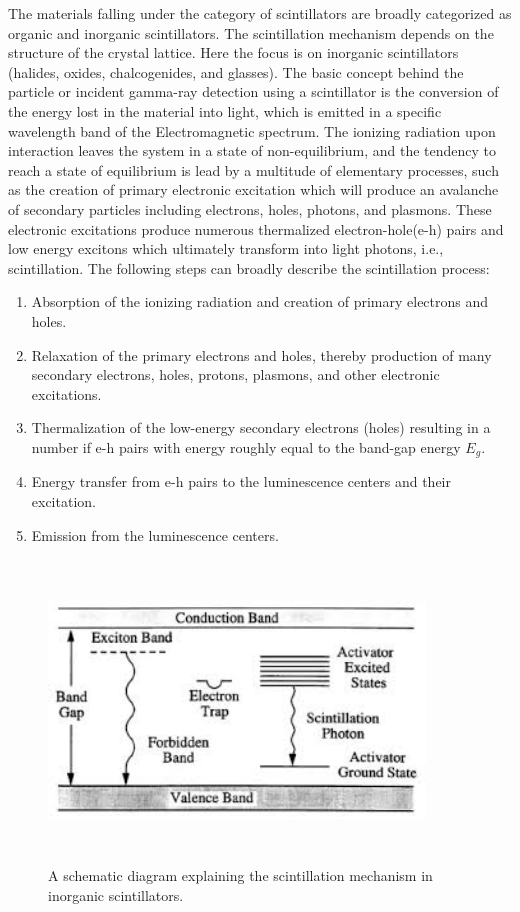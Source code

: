 The materials falling under the category of scintillators are broadly categorized as organic and inorganic scintillators. The scintillation mechanism depends on the structure of the crystal lattice. Here the focus is on inorganic scintillators (halides, oxides, chalcogenides, and glasses). The basic concept behind the particle or incident gamma-ray detection using a scintillator is the conversion of the energy lost in the material into light, which is emitted in a specific wavelength band of the Electromagnetic spectrum. 
The ionizing radiation upon interaction leaves the system in a state of non-equilibrium, and the tendency to reach a state of equilibrium is lead by a multitude of elementary processes, such as the creation of primary electronic excitation which will produce an avalanche of secondary particles including electrons, holes, photons, and plasmons. These electronic excitations produce numerous thermalized electron-hole(e-h) pairs and low energy excitons which ultimately transform into light photons, i.e., scintillation. The following steps can broadly describe the scintillation process:
\begin{enumerate}
	\item Absorption of the ionizing radiation and creation of primary electrons and holes.
	\item Relaxation of the primary electrons and holes, thereby production of many secondary electrons, holes, protons, plasmons, and other electronic excitations.
	\item Thermalization of the low-energy secondary electrons (holes) resulting in a number if e-h pairs with energy roughly equal to the band-gap energy $E_{g}$.
	\item Energy transfer from e-h pairs to the luminescence centers and their excitation.
	\item Emission from the luminescence centers.
\end{enumerate}
\begin{figure}[h!]
	\centering
	\includegraphics[width=10cm,height=8cm]{figures/inorganic_scintillators_mechanism.jpeg}
	\caption[A schematic diagram explaining the scintillation]{A schematic diagram explaining the scintillation mechanism in inorganic scintillators. }
	\label{fig:scintillation_mechanism}
\end{figure}



